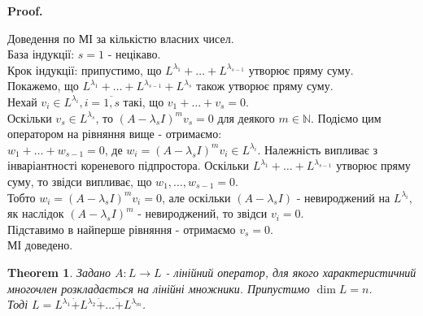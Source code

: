 \documentclass[a4paper, 10pt]{article}
\makeatletter
\theoremstyle{theoremdd}
\newtheorem{theorem}{Theorem}[subsection]
\renewenvironment{proof}[1][Proof.\\]{\par
\pushQED{\hfill \qed}%
\normalfont \topsep6\p@\@plus6\p@\relax
\trivlist
\item\relax
{\bfseries
#1\@addpunct{.}}\hspace\labelsep\ignorespaces
}{%
\popQED\endtrivlist\@endpefalse
}
\makeatother
\begin{document}
\begin{proof}
Доведення по МІ за кількістю власних чисел.\\
База індукції: $s = 1$ - нецікаво.\\
Крок індукції: припустимо, що $L^{\lambda_1}+\dots +L^{\lambda_{s-1}}$ утворює пряму суму. \\ Покажемо, що $L^{\lambda_1}+\dots + L^{\lambda_{s-1}} + L^{\lambda_s}$ також утворює пряму суму.\\
Нехай $v_i \in L^{\lambda_i}, i = \overline{1,s}$ такі, що $v_1+\dots+v_s = 0$.\\
Оскільки $v_s \in L^{\lambda_s}$, то $(A-\lambda_s I)^m v_s = 0$ для деякого $m \in \mathbb{N}$. Подіємо цим оператором на рівняння вище - отримаємо:\\
$w_1 + \dots + w_{s-1} = 0$, де $w_i = (A-\lambda_s I)^m v_i \in L^{\lambda_i}$. Належність випливає з інваріантності кореневого підпростора. Оскільки $L^{\lambda_1}+\dots +L^{\lambda_{s-1}}$ утворює пряму суму, то звідси випливає, що $w_1,\dots,w_{s-1} = 0$.\\
Тобто $w_i = (A-\lambda_s I)^m v_i = 0$, але оскільки $(A-\lambda_s I)$ - невироджений на $L^{\lambda_i}$, як наслідок  $(A-\lambda_s I)^m$ - невироджений, то звідси $v_i = 0$.\\
Підставимо в найперше рівняння - отримаємо $v_s = 0$.\\
МІ доведено.
\end{proof}

\begin{theorem}
\label{space_decomposition_into_generalized_eigenspace}
Задано $A \colon L \to L$ - лінійний оператор, для якого характеристичний многочлен розкладається на лінійні множники. Припустимо $\dim L = n$.\\
Тоді $L = L^{\lambda_1} \dot{+} L^{\lambda_2} \dot{+} \dots \dot{+} L^{\lambda_m}$.
\end{theorem}
\end{document}

